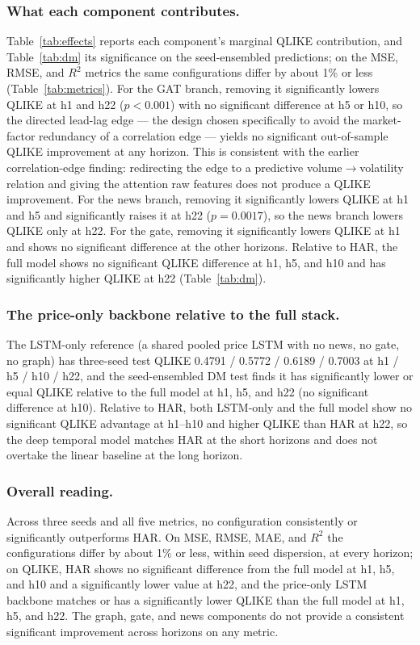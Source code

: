 \documentclass[runningheads]{llncs}
\begin{document}
\subsubsection{What each component contributes.}
Table~\ref{tab:effects} reports each component's marginal QLIKE contribution, and Table~\ref{tab:dm} its
significance on the seed-ensembled predictions; on the MSE, RMSE, and $R^2$ metrics the same configurations
differ by about 1\% or less (Table~\ref{tab:metrics}). For the GAT branch, removing it significantly lowers
QLIKE at h1 and h22 ($p<0.001$) with no significant difference at h5 or h10, so the directed lead-lag edge
--- the design chosen specifically to avoid the market-factor redundancy of a correlation edge --- yields no
significant out-of-sample QLIKE improvement at any horizon. This is consistent with the earlier
correlation-edge finding: redirecting the edge to a predictive volume$\to$volatility relation and giving the
attention raw features does not produce a QLIKE improvement. For the news branch, removing it significantly
lowers QLIKE at h1 and h5 and significantly raises it at h22 ($p=0.0017$), so the news branch lowers QLIKE
only at h22. For the gate, removing it significantly lowers QLIKE at h1 and shows no significant difference
at the other horizons. Relative to HAR, the full model shows no significant QLIKE difference at h1, h5, and
h10 and has significantly higher QLIKE at h22 (Table~\ref{tab:dm}).

\subsubsection{The price-only backbone relative to the full stack.}
The LSTM-only reference (a shared pooled price LSTM with no news, no gate, no graph) has three-seed test
QLIKE 0.4791 / 0.5772 / 0.6189 / 0.7003 at h1 / h5 / h10 / h22, and the seed-ensembled DM test finds it has
significantly lower or equal QLIKE relative to the full model at h1, h5, and h22 (no significant difference
at h10). Relative to HAR, both LSTM-only and the full model show no significant QLIKE advantage at h1--h10
and higher QLIKE than HAR at h22, so the deep temporal model matches HAR at the short horizons and does not
overtake the linear baseline at the long horizon.

\subsubsection{Overall reading.}
Across three seeds and all five metrics, no configuration consistently or significantly outperforms HAR. On
MSE, RMSE, MAE, and $R^2$ the configurations differ by about 1\% or less, within seed dispersion, at every
horizon; on QLIKE, HAR shows no significant difference from the full model at h1, h5, and h10 and a
significantly lower value at h22, and the price-only LSTM backbone matches or has a significantly lower
QLIKE than the full model at h1, h5, and h22. The graph, gate, and news components do not provide a
consistent significant improvement across horizons on any metric.
\end{document}
